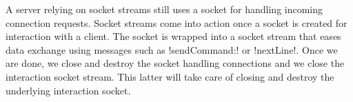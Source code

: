 \documentclass[a4paper,10pt,twoside]{book}
\begin{document}
A server relying on socket streams still uses a socket for handling incoming connection requests.
Socket streams come into action once a socket is created for interaction with a client.
The socket is wrapped into a socket stream that eases data exchange using messages such as \ct!sendCommand:! or \ct!nextLine!.
Once we are done, we close and destroy the socket handling connections and we close the interaction socket stream.
This latter will take care of closing and destroy the underlying interaction socket.


%
%
%
%
%
%
%
%
%
%
%
%
\end{document}
